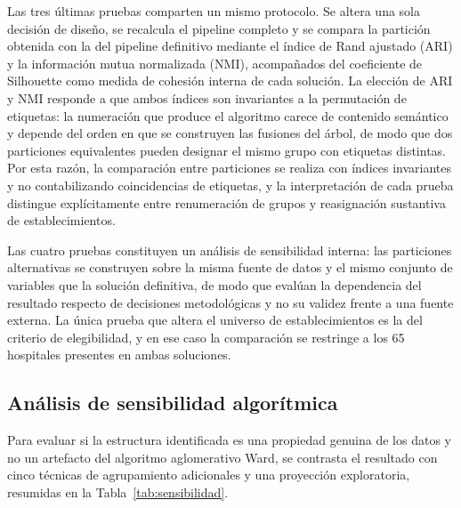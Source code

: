 Las tres últimas pruebas comparten un mismo protocolo. Se altera una sola decisión
de diseño, se recalcula el pipeline completo y se compara la partición obtenida con la del pipeline definitivo mediante el índice de
Rand ajustado (ARI) y la información mutua normalizada (NMI), acompañados del
coeficiente de Silhouette como medida de cohesión interna de cada solución. La
elección de ARI y NMI responde a que ambos índices son invariantes a la
permutación de etiquetas: la numeración que produce el algoritmo carece de
contenido semántico y depende del orden en que se construyen las fusiones del
árbol, de modo que dos particiones equivalentes pueden designar el mismo grupo con
etiquetas distintas. Por esta razón, la comparación entre particiones se realiza
con índices invariantes y no contabilizando coincidencias de etiquetas, y la
interpretación de cada prueba distingue explícitamente entre renumeración de
grupos y reasignación sustantiva de establecimientos.

Las cuatro pruebas constituyen un análisis de sensibilidad interna: las
particiones alternativas se construyen sobre la misma fuente de datos y el mismo
conjunto de variables que la solución definitiva, de modo que evalúan la
dependencia del resultado respecto de decisiones metodológicas y no su validez
frente a una fuente externa. La única prueba que altera el universo de
establecimientos es la del criterio de elegibilidad, y en ese caso la comparación
se restringe a los 65 hospitales presentes en ambas soluciones.

\subsection{Análisis de sensibilidad algorítmica}
\label{sec:sensibilidad}

Para evaluar si la estructura identificada es una propiedad genuina de los datos
y no un artefacto del algoritmo aglomerativo Ward, se contrasta el resultado con
cinco técnicas de agrupamiento adicionales y una proyección exploratoria, resumidas en la
Tabla~\ref{tab:sensibilidad}.

